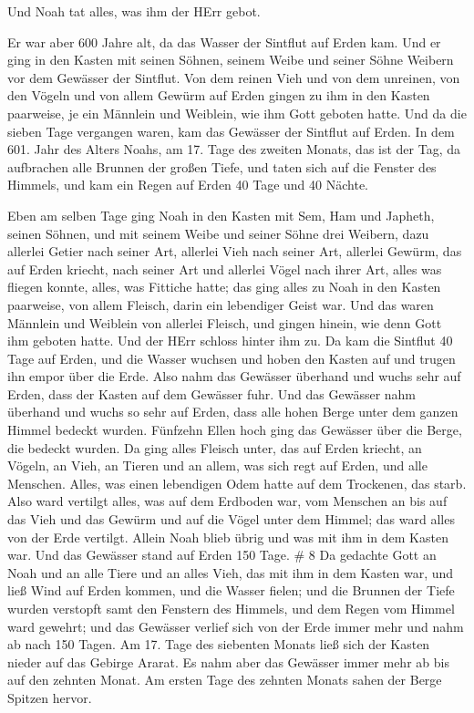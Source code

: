  Und Noah tat alles, was ihm der HErr gebot.

 Er war aber 600 Jahre alt, da das Wasser der Sintflut auf
Erden kam.  Und er ging in den Kasten mit seinen Söhnen,
seinem Weibe und seiner Söhne Weibern vor dem Gewässer der Sintflut.
 Von dem reinen Vieh und von dem unreinen, von den Vögeln
und von allem Gewürm auf Erden  gingen zu ihm in den Kasten
paarweise, je ein Männlein und Weiblein, wie ihm Gott geboten hatte.
 Und da die sieben Tage vergangen waren, kam das Gewässer
der Sintflut auf Erden.  In dem 601. Jahr des Alters Noahs,
am 17. Tage des zweiten Monats, das ist der Tag, da aufbrachen alle
Brunnen der großen Tiefe, und taten sich auf die Fenster des Himmels,
 und kam ein Regen auf Erden 40 Tage und 40 Nächte.

 Eben am selben Tage ging Noah in den Kasten mit Sem, Ham
und Japheth, seinen Söhnen, und mit seinem Weibe und seiner Söhne drei
Weibern,  dazu allerlei Getier nach seiner Art, allerlei
Vieh nach seiner Art, allerlei Gewürm, das auf Erden kriecht, nach
seiner Art und allerlei Vögel nach ihrer Art, alles was fliegen konnte,
alles, was Fittiche hatte;  das ging alles zu Noah in den
Kasten paarweise, von allem Fleisch, darin ein lebendiger Geist war.
 Und das waren Männlein und Weiblein von allerlei Fleisch,
und gingen hinein, wie denn Gott ihm geboten hatte. Und der HErr schloss
hinter ihm zu.  Da kam die Sintflut 40 Tage auf Erden, und
die Wasser wuchsen und hoben den Kasten auf und trugen ihn empor über
die Erde.  Also nahm das Gewässer überhand und wuchs sehr
auf Erden, dass der Kasten auf dem Gewässer fuhr.  Und das
Gewässer nahm überhand und wuchs so sehr auf Erden, dass alle hohen
Berge unter dem ganzen Himmel bedeckt wurden.  Fünfzehn
Ellen hoch ging das Gewässer über die Berge, die bedeckt wurden.
 Da ging alles Fleisch unter, das auf Erden kriecht, an
Vögeln, an Vieh, an Tieren und an allem, was sich regt auf Erden, und
alle Menschen.  Alles, was einen lebendigen Odem hatte auf
dem Trockenen, das starb.  Also ward vertilgt alles, was
auf dem Erdboden war, vom Menschen an bis auf das Vieh und das Gewürm
und auf die Vögel unter dem Himmel; das ward alles von der Erde
vertilgt. Allein Noah blieb übrig und was mit ihm in dem Kasten war.
 Und das Gewässer stand auf Erden 150 Tage. \# 8
 Da gedachte Gott an Noah und an alle Tiere und an alles
Vieh, das mit ihm in dem Kasten war, und ließ Wind auf Erden kommen, und
die Wasser fielen;  und die Brunnen der Tiefe wurden
verstopft samt den Fenstern des Himmels, und dem Regen vom Himmel ward
gewehrt;  und das Gewässer verlief sich von der Erde immer
mehr und nahm ab nach 150 Tagen.  Am 17. Tage des siebenten
Monats ließ sich der Kasten nieder auf das Gebirge Ararat. 
Es nahm aber das Gewässer immer mehr ab bis auf den zehnten Monat. Am
ersten Tage des zehnten Monats sahen der Berge Spitzen hervor.

